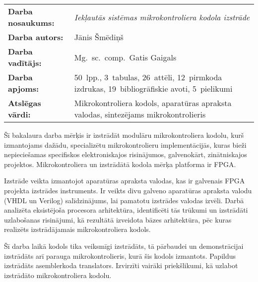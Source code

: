 
\abstitlestyle{\abstractname} %
\noindent%
\begin{tabularx}{\textwidth}{lX}
	\textbf{Darba nosaukums:} & 
		\textit{Iekļautās sistēmas mikrokontroliera kodola izstrāde}\\[1ex]
	\textbf{Darba autors:} & Jānis Šmēdiņš\\[1ex]
	\textbf{Darba vadītājs:} & Mg.~sc.~comp.~Gatis Gaigals\\[1ex]
	\textbf{Darba apjoms:} & 50~lpp., 3~tabulas, 26~attēli,
		12~pirmkoda izdrukas, 19~bibliogrāfiskie avoti, 5~pielikumi\\[1ex]
	\textbf{Atslēgas vārdi:} & Mikrokontroliera kodols, aparatūras apraksta valodas,
		sintezējams mikrokontrolieris
\end{tabularx}

\vspace{1em}
Šī bakalaura darba mērķis ir izstrādāt modulāru mikrokontroliera kodolu,
kurš izmantojams dažādu, specializētu mikrokontrolieru implementācijās,
kuras bieži nepieciešamas specifiskos elektroniskajos risinājumos,
galvenokārt, zinātniskajos projektos. Mikrokontroliera un
izstrādātā kodola mērķa platforma ir FPGA.

Izstrāde veikta izmantojot aparatūras apraksta valodas, kas ir galvenais
FPGA projekta izstrādes instruments. Ir veikts divu galveno aparatūras
apraksta valodu (VHDL un Verilog) salīdzinājums, lai pamatotu izstrādes valodas izvēli.
Darbā analizēta eksistējoša procesora
arhitektūra, identificēti tās
trūkumi un izstrādāti uzlabošanas risinājumi, kā rezultātā izveidota 
bāzes arhitektūra, pēc kuras
realizēts izstrādājamais mikrokontroliera kodols.

Šī darba laikā kodols tika veiksmīgi izstrādāts, tā pārbaudei un 
demonstrācijai izstrādāts arī parauga mikrokontrolieris, kurā šis kodols
izmantots. Papildus izstrādāts asemblerkoda translators.
Izvirzīti vairāki priekšlikumi, kā uzlabot izstrādāto
mikrokontroliera kodolu.

